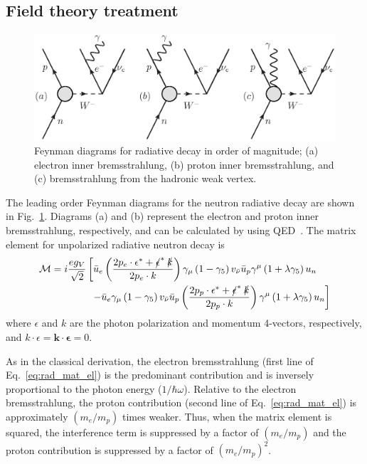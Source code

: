 \documentclass[oneside,12pt]{memoir}
\begin{document}
\subsection{Field theory treatment}
\label{sec:field_theory}
\begin{figure}
	\includegraphics[width=\textwidth]{radiative_decay.eps}
	\caption[Feynman diagrams for radiative decay.]{Feynman diagrams for radiative decay in order of magnitude; (a) electron inner bremsstrahlung, (b) proton inner bremsstrahlung, and (c) bremsstrahlung from the hadronic weak vertex.}
	\label{fig:feynman_rad}
\end{figure}
The leading order Feynman diagrams for the neutron radiative decay are shown in Fig.~\ref{fig:feynman_rad}. Diagrams (a) and (b) represent the electron and proton inner brem\-sstrah\-lung, respectively, and can be calculated by using QED~\cite{Gaponov96,Gaponov00}. The matrix element for unpolarized radiative neutron decay is
\begin{align}
	\mathcal{M}=i\frac{eg_V}{\sqrt{2}} & \left[\bar{u}_e
		\left(\frac{2p_e\cdot\epsilon^{*}+
		\slashed{\epsilon}^*\:\slashed{k}}{2p_e\cdot k}\right)
		\gamma_\mu\left(1-\gamma_5\right)v_{\bar{\nu}}\bar{u}_p
		\gamma^\mu\left(1+\lambda\gamma_5\right)u_n\right.
		\nonumber\\
	& \:\:\left. -\bar{u}_e\gamma_\mu\left(1-\gamma_5\right)
		v_{\bar{\nu}}\bar{u}_p\left(
		\frac{2p_p\cdot\epsilon^*+\slashed{\epsilon}^*
			\:\slashed{k}}{2p_p\cdot k}\right)\gamma^\mu
		\left(1+\lambda\gamma_5\right)u_n \right]
	\label{eq:rad_mat_el}
\end{align}
where $\epsilon$ and $k$ are the photon polarization and momentum 4-vectors, respectively, and $k\cdot\epsilon = \mathbf{k}\cdot\boldsymbol{\epsilon} = 0$.\par
As in the classical derivation, the electron bremsstrahlung (first line of Eq.~\ref{eq:rad_mat_el}) is the predominant contribution and is inversely proportional to the photon energy ($1/\hbar\omega$). Relative to the electron bremsstrahlung, the proton contribution (second line of Eq.~\ref{eq:rad_mat_el}) is approximately $(m_e/m_p)$ times weaker. Thus, when the matrix element is squared, the interference term is suppressed by a factor of $(m_e/m_p)$ and the proton contribution is suppressed by a factor of $(m_e/m_p)^2$.\par
\end{document}

